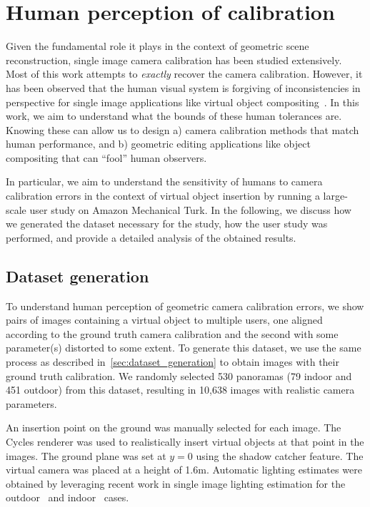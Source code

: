 \section{Human perception of calibration}
\label{sec:human_sensitivity_analysis}

Given the fundamental role it plays in the context of geometric scene reconstruction, single image camera calibration has been studied extensively. Most of this work attempts to \emph{exactly} recover the camera calibration. However, it has been observed that the human visual system is forgiving of inconsistencies in perspective for single image applications like virtual object compositing~\cite{karsch2014automatic}. In this work, we aim to understand what the bounds of these human tolerances are. Knowing these can allow us to design a) camera calibration methods that match human performance, and b) geometric editing applications like object compositing that can ``fool'' human observers.

In particular, we aim to understand the sensitivity of humans to camera calibration errors in the context of virtual object insertion by running a large-scale user study on Amazon Mechanical Turk. In the following, we discuss how we generated the dataset necessary for the study, how the user study was performed, and provide a detailed analysis of the obtained results.


\subsection{Dataset generation}
\label{sec:dataset_organization}

To understand human perception of geometric camera calibration errors, we show pairs of images containing a virtual object to multiple users, one aligned according to the ground truth camera calibration and the second with some parameter(s) distorted to some extent. To generate this dataset, we use the same process as described in~\ref{sec:dataset_generation} to obtain images with their ground truth calibration. We randomly selected 530 panoramas (79 indoor and 451 outdoor) from this dataset, resulting in 10,638 images with realistic camera parameters. 

An insertion point on the ground was manually selected for each image. The Cycles renderer was used to realistically insert virtual objects at that point in the images. The ground plane was set at $y=0$ using the shadow catcher feature. The virtual camera was placed at a height of 1.6m. Automatic lighting estimates were obtained by leveraging recent work in single image lighting estimation for the outdoor~\cite{holdgeoffroy-cvpr-17} and indoor~\cite{gardner-sigasia-17} cases. 

